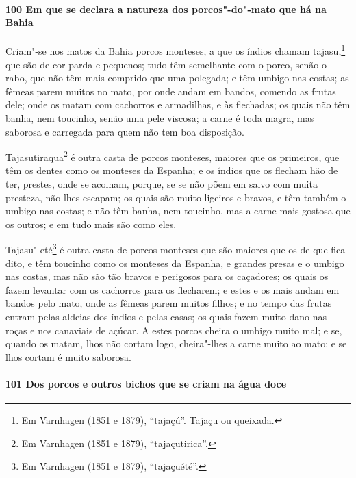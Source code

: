 \paragraph{100 Em que se declara a natureza dos porcos"-do"-mato que há na Bahia}

Criam"-se nos matos da Bahia porcos monteses, a que os índios chamam tajasu,\footnote{ Em
Varnhagen (1851 e 1879), ``tajaçú''. Tajaçu ou queixada.} que são de cor parda e
pequenos; tudo têm semelhante com o porco, senão o rabo, que não têm mais comprido que uma
polegada; e têm umbigo nas costas; as fêmeas parem muitos no mato, por onde andam em
bandos, comendo as frutas dele; onde os matam com cachorros e armadilhas, e às flechadas;
os quais não têm banha, nem toucinho, senão uma pele viscosa; a carne é toda magra, mas
saborosa e carregada para quem não tem boa disposição.

Tajasutiraqua\footnote{ Em Varnhagen (1851 e 1879), ``tajaçutirica''.} é outra casta de
porcos monteses, maiores que os primeiros, que têm os dentes como os monteses da Espanha;
e os índios que os flecham hão de ter, prestes, onde se acolham, porque, se se não põem em
salvo com muita presteza, não lhes escapam; os quais são muito ligeiros e bravos, e têm
também o umbigo nas costas; e não têm banha, nem toucinho, mas a carne mais gostosa que os
outros; e em tudo mais são como eles.

Tajasu"-eté\footnote{ Em Varnhagen (1851 e 1879), ``tajaçuété''.} é outra casta de porcos
monteses que são maiores que os de que fica dito, e têm toucinho como os monteses da
Espanha, e grandes presas e o umbigo nas costas, mas não são tão bravos e perigosos para
os caçadores; os quais os fazem levantar com os cachorros para os flecharem; e estes e os
mais andam em bandos pelo mato, onde as fêmeas parem muitos filhos; e no tempo das frutas
entram pelas aldeias dos índios e pelas casas; os quais fazem muito
dano nas roças e nos canaviais de açúcar. A estes porcos cheira o umbigo muito mal; e se,
quando os matam, lhos não cortam logo, cheira"-lhes a carne muito ao mato; e se lhos cortam
é muito saborosa.

\paragraph{101 Dos porcos e outros bichos que se criam na água doce}

